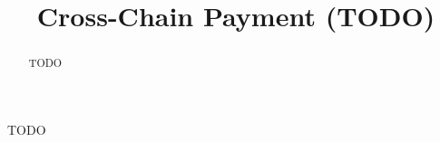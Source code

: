 \documentclass[sigconf, natbib=false]{acmart}
\begin{document}
\title{Cross-Chain Payment (TODO)}

\begin{abstract}
TODO
\end{abstract}


\maketitle











\begin{acks}
TODO
\end{acks}

\printbibliography


\end{document}

